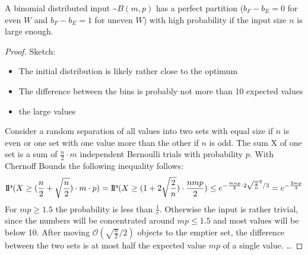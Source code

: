 \begin{lemma}\label{lemma:BinomialSolvable}
    A binomial distributed input \textasciitilde$B(m,p)$ has a perfect partition ($b_F - b_E = 0$ for even $W$ and $b_F - b_E = 1$ for uneven $W$) with high probability if the input size $n$ is large enough.
\end{lemma}
\begin{proof}
    Sketch:
    \begin{itemize}
        \item The initial distribution is likely rather close to the optimum
        \item The difference between the bins is probably not more than 10 expected values
        \item the large values
    \end{itemize}
    Consider a random separation of all values into two sets with equal size if $n$ is even or one set with one value more than the other if $n$ is odd. The sum X of one set is a sum of $\frac{n}{2}\cdot m$ independent Bernoulli trials with probability $p$. With Chernoff Bounds the following inequality follows:
    \[\text{I\kern-0.15em P}(X\ge(\frac{n}{2}+\sqrt{\frac{n}{2}})\cdot m \cdot p) = \text{I\kern-0.15em P}(X\ge(1+2\sqrt{\frac{2}{n}})\cdot \frac{nmp}{2}) \le e^{-\frac{mnp}{2}\cdot2\sqrt{\frac{2}{n}}^2 /3} = e^{-\frac{2mp}{3}}\]
    For $mp\ge1.5$ the probability is less than $\frac{1}{e}$. Otherwise the input is rather trivial, since the numbers will be concentrated around $mp\le1.5$ and most values will be below 10.\newline
    After moving $\mathcal{O}(\sqrt{\frac{n}{2}}/2)$ objects to the emptier set, the difference between the two sets is at most half the expected value $mp$ of a single value.
    \dots
\end{proof}


